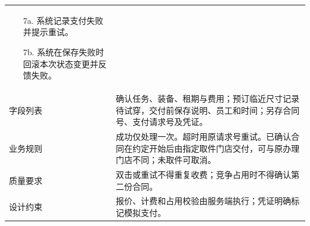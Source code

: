 \documentclass[11pt,a4paper]{article}
\newcommand{\bottomrule}{\hline}
\begin{document}
{\begin{longtable}{L{2.2cm}L{13.1cm}}
\begin{itemize}
\item[7a.] 系统记录支付失败并提示重试。
\item[7b.] 系统在保存失败时回滚本次状态变更并反馈失败。
\end{itemize}\\
字段列表 & 确认任务、装备、租期与费用；预订临近尺寸记录待试穿，交付前保存说明、员工和时间；另存合同号、支付请求号及凭证。\\
业务规则 & 成功仅处理一次。超时用原请求号重试。已确认合同在约定开始后由指定取件门店交付，可与原办理门店不同；未取件可取消。\\
质量要求 & 双击或重试不得重复收费；竞争占用时不得确认第二份合同。\\
设计约束 & 报价、计费和占用校验由服务端执行；凭证明确标记模拟支付。\\
\bottomrule
\end{longtable}}

\clearpage
\end{document}
